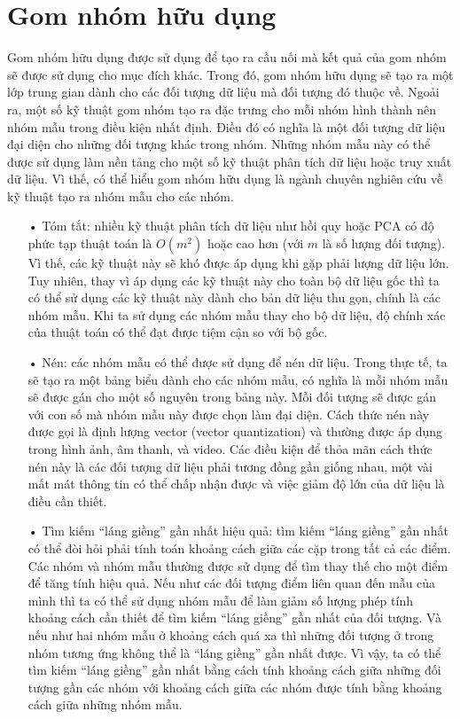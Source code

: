 \section{Gom nhóm hữu dụng}
Gom nhóm hữu dụng được sử dụng để tạo ra cầu nối mà kết quả của gom nhóm sẽ được sử dụng cho mục đích khác.
Trong đó, gom nhóm hữu dụng sẽ tạo ra một lớp trung gian dành cho các đối tượng dữ liệu mà đối tượng đó thuộc về.
Ngoải ra, một số kỹ thuật gom nhóm tạo ra đặc trưng cho mỗi nhóm hình thành nên nhóm mẫu trong điều kiện nhất định.
Điều đó có nghĩa là một đối tượng dữ liệu đại diện cho những đối tượng khác trong nhóm.
Những nhóm mẫu này có thể được sử dụng làm nền tảng cho một số kỹ thuật phân tích dữ liệu hoặc truy xuất dữ liệu.
Vì thế, có thể hiểu gom nhóm hữu dụng là ngành chuyên nghiên cứu về kỹ thuật tạo ra nhóm mẫu cho các nhóm.
\begin{enumerate}
\item[•]Tóm tắt: nhiều kỹ thuật phân tích dữ liệu như hồi quy hoặc PCA có độ phức tạp thuật toán là $O(m^2)$ hoặc cao hơn (với $m$ là số lượng đối tượng).
Vì thế, các kỹ thuật này sẽ khó được áp dụng khi gặp phải lượng dữ liệu lớn.
Tuy nhiên, thay vì áp dụng các kỹ thuật này cho toàn bộ dữ liệu gốc thì ta có thể sử dụng các kỹ thuật này dành cho bản dữ liệu thu gọn, chính là các nhóm mẫu.
Khi ta sử dụng các nhóm mẫu thay cho bộ dữ liệu, độ chính xác của thuật toán có thể đạt được tiệm cận so với bộ gốc. 
\item[•]Nén: các nhóm mẫu có thể được sử dụng để nén dữ liệu.
Trong thực tế, ta sẽ tạo ra một bảng biểu dành cho các nhóm mẫu, có nghĩa là mỗi nhóm mẫu sẽ được gán cho một số nguyên trong bảng này.
Mỗi đối tượng sẽ được gán với con số mà nhóm mẫu này được chọn làm đại diện.
Cách thức nén này được gọi là định lượng vector (vector quantization) và thường được áp dụng trong hình ảnh, âm thanh, và video.
Các điều kiện để thỏa mãn cách thức nén này là các đối tượng dữ liệu phải tương đồng gần giống nhau, một vài mất mát thông tin có thể chấp nhận được và việc giảm độ lớn của dữ liệu là điều cần thiết.
\item[•]Tìm kiếm ``láng giềng'' gần nhất hiệu quả: tìm kiếm ``láng giềng'' gần nhất có thể đòi hỏi phải tính toán khoảng cách giữa các cặp trong tất cả các điểm.
Các nhóm và nhóm mẫu thường được sử dụng để tìm thay thế cho một điểm để tăng tính hiệu quả.
Nếu như các đối tượng điểm liên quan đến mẫu của mình thì ta có thể sử dụng nhóm mẫu để làm giảm số lượng phép tính khoảng cách cần thiết để tìm kiếm ``láng giềng'' gần nhất của đối tượng.
Và nếu như hai nhóm mẫu ở khoảng cách quá xa thì những đối tượng ở trong nhóm tương ứng không thể là ``láng giềng'' gần nhất được.
Vì vậy, ta có thể tìm kiếm ``láng giềng'' gần nhất bằng cách tính khoảng cách giữa những đối tượng gần các nhóm với khoảng cách giữa các nhóm được tính bằng khoảng cách giữa những nhóm mẫu.
\end{enumerate}

